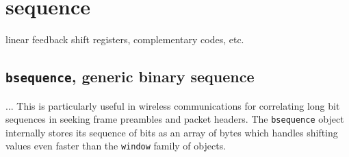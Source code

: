 % 
%

\section{sequence}
\label{module:sequence}
linear feedback shift registers, complementary codes, etc.

\subsection{{\tt bsequence}, generic binary sequence}
\label{module:sequence:bsequence}
...
This is particularly useful in wireless communications for correlating long
bit sequences in seeking frame preambles and packet headers.
The {\tt bsequence} object internally stores its sequence of bits as an array
of bytes which handles shifting values even faster than the {\tt window}
family of objects.

